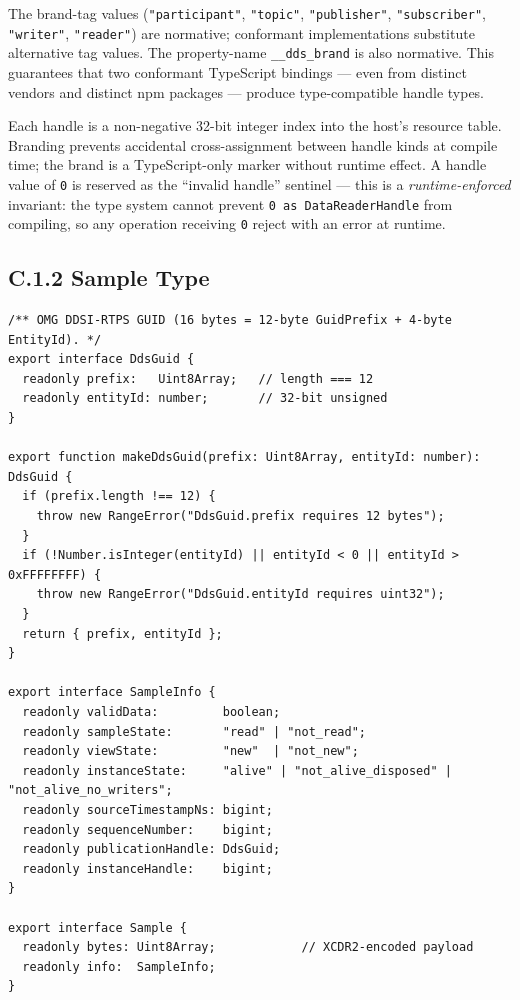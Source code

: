 \documentclass{../styles/zerodds-vendor-spec}
\begin{document}
The brand-tag values (\texttt{"participant"}, \texttt{"topic"},
\texttt{"publisher"}, \texttt{"subscriber"}, \texttt{"writer"},
\texttt{"reader"}) are normative; conformant implementations
 substitute alternative tag values. The
property-name \texttt{\_\_dds\_brand} is also normative. This
guarantees that two conformant TypeScript bindings — even from
distinct vendors and distinct npm packages — produce
type-compatible handle types.

Each handle is a non-negative 32-bit integer index into the
host's resource table. Branding prevents accidental
cross-assignment between handle kinds at compile time; the
brand is a TypeScript-only marker without runtime effect. A
handle value of \texttt{0} is reserved as the ``invalid
handle'' sentinel — this is a \emph{runtime-enforced}
invariant: the type system cannot prevent
\texttt{0 as DataReaderHandle} from compiling, so any operation
receiving \texttt{0}  reject with an error at
runtime.

\subsection*{C.1.2 Sample Type}

\begin{lstlisting}
/** OMG DDSI-RTPS GUID (16 bytes = 12-byte GuidPrefix + 4-byte EntityId). */
export interface DdsGuid {
  readonly prefix:   Uint8Array;   // length === 12
  readonly entityId: number;       // 32-bit unsigned
}

export function makeDdsGuid(prefix: Uint8Array, entityId: number): DdsGuid {
  if (prefix.length !== 12) {
    throw new RangeError("DdsGuid.prefix requires 12 bytes");
  }
  if (!Number.isInteger(entityId) || entityId < 0 || entityId > 0xFFFFFFFF) {
    throw new RangeError("DdsGuid.entityId requires uint32");
  }
  return { prefix, entityId };
}

export interface SampleInfo {
  readonly validData:         boolean;
  readonly sampleState:       "read" | "not_read";
  readonly viewState:         "new"  | "not_new";
  readonly instanceState:     "alive" | "not_alive_disposed" | "not_alive_no_writers";
  readonly sourceTimestampNs: bigint;
  readonly sequenceNumber:    bigint;
  readonly publicationHandle: DdsGuid;
  readonly instanceHandle:    bigint;
}

export interface Sample {
  readonly bytes: Uint8Array;            // XCDR2-encoded payload
  readonly info:  SampleInfo;
}
\end{lstlisting}
\end{document}
